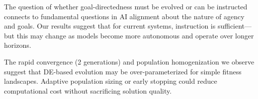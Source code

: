 The question of whether goal-directedness must be evolved or can be instructed connects to fundamental questions in AI alignment about the nature of agency and goals.
Our results suggest that for current systems, instruction is sufficient---but this may change as models become more autonomous and operate over longer horizons.

The rapid convergence (2 generations) and population homogenization we observe suggest that DE-based evolution may be over-parameterized for simple fitness landscapes.
Adaptive population sizing or early stopping could reduce computational cost without sacrificing solution quality.
